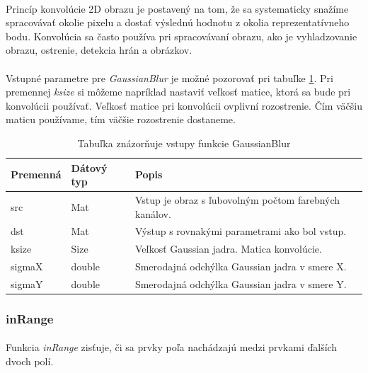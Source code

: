 \documentclass[12pt]{article}
\begin{document}
\paragraph{}
Princíp konvolúcie 2D obrazu je postavený na tom, že sa systematicky snažíme spracovávať okolie pixelu a dostať výslednú hodnotu z okolia reprezentatívneho bodu.
Konvolúcia sa často používa pri spracovávaní obrazu, ako je vyhladzovanie obrazu, ostrenie, detekcia hrán a obrázkov.
\cite{convolution, DIP}
\paragraph{}
Vstupné parametre pre \emph{GaussianBlur} je možné pozorovať pri tabuľke \ref{gaussianblurPar}. 
Pri premennej \emph{ksize} si môžeme napríklad nastaviť veľkosť matice, ktorá sa bude pri konvolúcii používať.
Veľkosť matice pri konvolúcii ovplivní rozostrenie. Čím väčšiu maticu používame, tím väčšie rozostrenie dostaneme.
\cite{OpenCVDoc}
\begin{table}
	\centering
    \begin{tabular}{ | l | l | p{5cm} |}
    \hline
    Premenná & Dátový typ & Popis \\ \hline
    src & Mat & Vstup je obraz s ľubovolným počtom farebných kanálov. \\ \hline
    dst & Mat & Výstup s rovnakými parametrami ako bol vstup. \\ \hline
    ksize & Size & Veľkosť Gaussian jadra. Matica konvolúcie. \\ \hline
    sigmaX & double & Smerodajná odchýlka Gaussian jadra v smere X. \\ \hline
    sigmaY & double & Smerodajná odchýlka Gaussian jadra v smere Y. \\
    \hline
    \end{tabular}
  	\caption{Tabuľka znázorňuje vstupy funkcie GaussianBlur}
  	\label{gaussianblurPar}
\end{table}
\subsubsection{inRange}
\paragraph{}
Funkcia \emph{inRange} zisťuje, či sa prvky poľa nachádzajú medzi prvkami ďalších dvoch polí.
\end{document}
